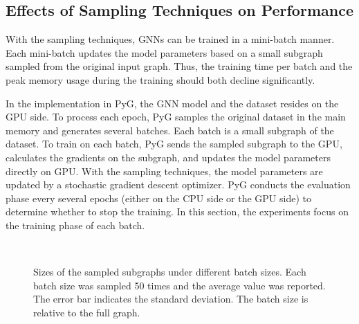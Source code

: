 \subsection{Effects of Sampling Techniques on Performance}
\label{sec:effects_of_sampling_techniques_on_performance}

With the sampling techniques, GNNs can be trained in a mini-batch manner.
Each mini-batch updates the model parameters based on a small subgraph sampled from the original input graph.
Thus, the training time per batch and the peak memory usage during the training should both decline significantly.

In the implementation in PyG, the GNN model and the dataset resides on the GPU side.
To process each epoch, PyG samples the original dataset in the main memory and generates several batches.
Each batch is a small subgraph of the dataset.
To train on each batch, PyG sends the sampled subgraph to the GPU, calculates the gradients on the subgraph, and updates the model parameters directly on GPU.
With the sampling techniques, the model parameters are updated by a stochastic gradient descent optimizer.
PyG conducts the evaluation phase every several epochs (either on the CPU side or the GPU side) to determine whether to stop the training.
In this section, the experiments focus on the training phase of each batch.

\begin{figure}[tbp]
    \centering
     \\
    \caption{Sizes of the sampled subgraphs under different batch sizes. Each batch size was sampled 50 times and the average value was reported. The error bar indicates the standard deviation. The batch size is relative to the full graph.}
    \label{fig:exp_sampling_minibatch_graph_info}
\end{figure}

